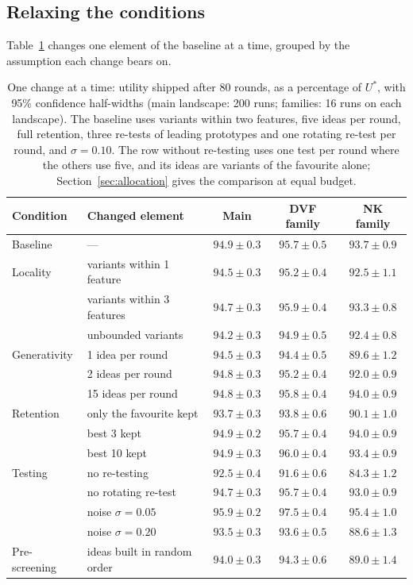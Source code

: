\documentclass[10pt,twocolumn]{article}
\theoremstyle{definition}
\begin{document}
\subsection{Relaxing the conditions}
\label{sec:ablation}

Table~\ref{tab:ablation} changes one element of the baseline at a time, grouped by the assumption each change bears on.

\begin{table}[t]
\caption{One change at a time: utility shipped after 80 rounds, as a percentage of $U^*$, with 95\% confidence half-widths (main landscape: 200 runs; families: 16 runs on each landscape). The baseline uses variants within two features, five ideas per round, full retention, three re-tests of leading prototypes and one rotating re-test per round, and $\sigma=0.10$. The row without re-testing uses one test per round where the others use five, and its ideas are variants of the favourite alone; Section~\ref{sec:allocation} gives the comparison at equal budget.}
\label{tab:ablation}
\centering\small
\begin{tabular}{@{}llccc@{}}
\toprule
Condition & Changed element & Main & DVF family & NK family\\
\midrule
Baseline & --- & $94.9\pm0.3$ & $95.7\pm0.5$ & $93.7\pm0.9$\\
\addlinespace[2pt]
Locality & variants within 1 feature & $94.5\pm0.3$ & $95.2\pm0.4$ & $92.5\pm1.1$\\
 & variants within 3 features & $94.7\pm0.3$ & $95.9\pm0.4$ & $93.3\pm0.8$\\
 & unbounded variants & $94.2\pm0.3$ & $94.9\pm0.5$ & $92.4\pm0.8$\\
\addlinespace[2pt]
Generativity & 1 idea per round & $94.5\pm0.3$ & $94.4\pm0.5$ & $89.6\pm1.2$\\
 & 2 ideas per round & $94.8\pm0.3$ & $95.2\pm0.4$ & $92.0\pm0.9$\\
 & 15 ideas per round & $94.8\pm0.3$ & $95.8\pm0.4$ & $94.0\pm0.9$\\
\addlinespace[2pt]
Retention & only the favourite kept & $93.7\pm0.3$ & $93.8\pm0.6$ & $90.1\pm1.0$\\
 & best 3 kept & $94.9\pm0.2$ & $95.7\pm0.4$ & $94.0\pm0.9$\\
 & best 10 kept & $94.9\pm0.3$ & $96.0\pm0.4$ & $93.4\pm0.9$\\
\addlinespace[2pt]
Testing & no re-testing & $92.5\pm0.4$ & $91.6\pm0.6$ & $84.3\pm1.2$\\
 & no rotating re-test & $94.7\pm0.3$ & $95.7\pm0.4$ & $93.0\pm0.9$\\
 & noise $\sigma=0.05$ & $95.9\pm0.2$ & $97.5\pm0.4$ & $95.4\pm1.0$\\
 & noise $\sigma=0.20$ & $93.5\pm0.3$ & $93.6\pm0.5$ & $88.6\pm1.3$\\
\addlinespace[2pt]
Pre-screening & ideas built in random order & $94.0\pm0.3$ & $94.3\pm0.6$ & $89.0\pm1.4$\\
\bottomrule
\end{tabular}
\end{table}
\end{document}
